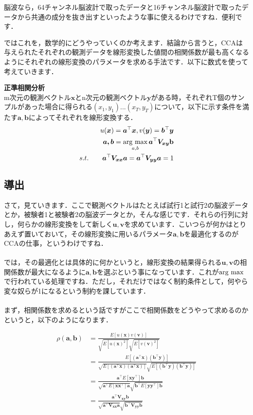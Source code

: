 \documentclass[11pt,a4paper,uplatex]{ujreport}
\newcommand{\argmax}{\mathop{\rm arg~max}\limits}
\begin{document}
脳波なら，64チャンネル脳波計で取ったデータと16チャンネル脳波計で取ったデータから共通の成分を抜き出すといったような事に使えるわけですね．便利です．

ではこれを，数学的にどうやっていくのか考えます．結論から言うと，CCAは与えられたそれぞれの観測データを線形変換した値間の相関係数が最も高くなるようにそれぞれの線形変換のパラメータを求める手法です．以下に数式を使って考えていきます．

\begin{screen}
  \textbf{正準相関分析}\\
  m次元の観測ベクトル$\bm{x}$とn次元の観測ベクトル$\bm{y}$がある時，それぞれT個のサンプルがあった場合に得られる$(x_1, y_1)...(x_T, y_T)$について，以下に示す条件を満たす$\bm{a,b}$によってそれぞれを線形変換する．
  \begin{align}
    u(\bm{x}) = \bm{a}^\top\bm{x}, v(\bm{y}) = \bm{b}^\top \bm{y}\\
    \bm{a,b} = \argmax_{a,b}\bm{a}^\top \bm{V_{xy}} \bf{b} \\
    s.t. \qquad \bm{a}^\top \bm{V_{xx}} \bm{a} = \bm{a}^\top \bm{V_{yy}} \bm{a} = 1 \nonumber
  \end{align}
\end{screen}

\subsection{導出}
さて，見ていきます．ここで観測ベクトルはたとえば試行1と試行2の脳波データとか，被験者1と被験者2の脳波データとか，そんな感じです．それらの行列に対し，何らかの線形変換をして新しく$\bm{u,v}$を求めています．こいつらが何かはとりあえず置いておいて，その線形変換に用いるパラメータ$\bm{a,b}$を最適化するのがCCAの仕事，というわけですね．\\
\\

では，その最適化とは具体的に何かというと，線形変換の結果得られる$\bm{u,v}$の相関係数が最大になるように$\bm{a,b}$を選ぶという事になっています．これが$\argmax$で行われている処理ですね．ただし，それだけではなく制約条件として，何やら変な奴らが1になるという制約を課しています．\\
\\

まず，相関係数を求めるという話ですがここで相関係数をどうやって求めるのかというと，以下のようになります．

\begin{align}
  \rho({\bm{a,b}}) &= \frac{E[u(\bm{x})v(\bm{v})]}{\sqrt{E[u(\bm{x})^2]}\sqrt{E[v(\bm{v})^2]}}\\
  &= \frac{E[(\bm{a^\top x})(\bm{b^\top y})]}{\sqrt{E[(\bm{a^\top x})(\bm{a^\top x})]}\sqrt{E[(\bm{b^\top y})(\bm{b^\top y})]}}\\
  &= \frac{\bm{a^\top}E[\bm{x y^\top}]\bm{b}}{\sqrt{\bm{a^\top}E[\bm{xx^\top}]\bm{a}}\sqrt{\bm{b^\top}E[\bm{yy^\top}]\bm{b}}}\label{eq:cca-sc0}\\
  &= \frac{\bm{a^\top V_{xy} b}}{\sqrt{\bm{a^\top V_{xx} a}}\sqrt{\bm{b^\top V_{yy} b}}}
  \label{eq:cca-sc}\\
\end{align}
\end{document}
